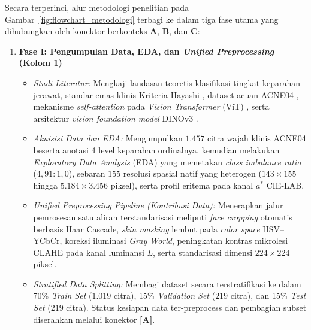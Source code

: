 Secara terperinci, alur metodologi penelitian pada Gambar~\ref{fig:flowchart_metodologi} terbagi ke dalam tiga fase utama yang dihubungkan oleh konektor berkonteks \textbf{A}, \textbf{B}, dan \textbf{C}:
\begin{enumerate}
    \item \textbf{Fase I: Pengumpulan Data, EDA, dan \textit{Unified Preprocessing} (Kolom 1)}
          \begin{itemize}
              \item \textit{Studi Literatur:} Mengkaji landasan teoretis klasifikasi tingkat keparahan jerawat, standar emas klinis Kriteria Hayashi \cite{hayashi2008}, dataset acuan ACNE04 \cite{wu2019, layeredlabs2026acne04}, mekanisme \textit{self-attention} pada \textit{Vision Transformer} (ViT) \cite{dosovitskiy2020image}, serta arsitektur \textit{vision foundation model} DINOv3 \cite{simeoni2025dinov3}.
              \item \textit{Akuisisi Data dan EDA:} Mengumpulkan $1.457$ citra wajah klinis ACNE04 beserta anotasi 4 level keparahan ordinalnya, kemudian melakukan \textit{Exploratory Data Analysis} (EDA) yang memetakan \textit{class imbalance ratio} ($4,91 : 1,0$), sebaran $155$ resolusi spasial natif yang heterogen ($143\times155$ hingga $5.184\times3.456$ piksel), serta profil eritema pada kanal $a^*$ CIE-LAB.
              \item \textit{Unified Preprocessing Pipeline (Kontribusi Data):} Menerapkan jalur pemrosesan satu aliran terstandarisasi meliputi \textit{face cropping} otomatis berbasis Haar Cascade, \textit{skin masking} lembut pada \textit{color space} HSV--YCbCr, koreksi iluminasi \textit{Gray World}, peningkatan kontras mikrolesi CLAHE pada kanal luminansi $L$, serta standarisasi dimensi $224\times224$ piksel.
              \item \textit{Stratified Data Splitting:} Membagi dataset secara terstratifikasi ke dalam 70\% \textit{Train Set} ($1.019$ citra), 15\% \textit{Validation Set} ($219$ citra), dan 15\% \textit{Test Set} ($219$ citra). Status kesiapan data ter-preprocess dan pembagian subset diserahkan melalui konektor \textbf{[A]}.
          \end{itemize}


\end{enumerate}
